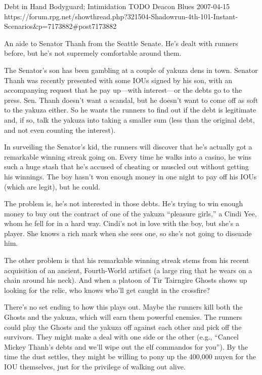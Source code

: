 \begin{scenario}{Debt in Hand}
	{Bodyguard; Intimidation}
	{TODO}
	{Deacon Blues}
	{2007-04-15}
	{https://forum.rpg.net/showthread.php?321504-Shadowrun-4th-101-Instant-Scenarios\&p=7173882\#post7173882}

An aide to Senator Thanh from the Seattle Senate. He's dealt with runners before, but he's not supremely comfortable around them.

\synopsis The Senator's son has been gambling at a couple of yakuza dens in town. Senator Thanh was recently presented with some IOUs signed by his son, with an accompanying request that he pay up---with interest---or the debts go to the press. Sen. Thanh doesn't want a scandal, but he doesn't want to come off as soft to the yakuza either. So he wants the runners to find out if the debt is legitimate and, if so, talk the yakuza into taking a smaller sum (less than the original debt, and not even counting the interest).

\twist In surveiling the Senator's kid, the runners will discover that he's actually got a remarkable winning streak going on. Every time he walks into a casino, he wins such a huge stash that he's accused of cheating or muscled out without getting his winnings. The boy hasn't won enough money in one night to pay off his IOUs (which are legit), but he could.

The problem is, he's not interested in those debts. He's trying to win enough money to buy out the contract of one of the yakuza ``pleasure girls,'' a Cindi Yee, whom he fell for in a hard way. Cindi's not in love with the boy, but she's a player. She knows a rich mark when she sees one, so she's not going to dissuade him.

The other problem is that his remarkable winning streak stems from his recent acquisition of an ancient, Fourth-World artifact (a large ring that he wears on a chain around his neck). And when a platoon of Tir Tairngire Ghosts shows up looking for the relic, who knows who'll get caught in the crossfire?

\notes  There's no set ending to how this plays out. Maybe the runners kill both the Ghosts and the yakuza, which will earn them powerful enemies. The runners could play the Ghosts and the yakuza off against each other and pick off the survivors. They might make a deal with one side or the other (e.g., ``Cancel Mickey Thanh's debts and we'll wipe out the elf commandos for you''). By the time the dust settles, they might be willing to pony up the 400,000 nuyen for the IOU themselves, just for the privilege of walking out alive. 

\end{scenario}
